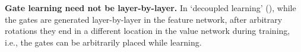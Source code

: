 \textbf{Gate learning need not be layer-by-layer.} In `decoupled learning' (), while the gates are generated layer-by-layer in the feature network, after arbitrary rotations they end in a different location in the value network during training, i.e., the gates can be arbitrarily placed while learning.


